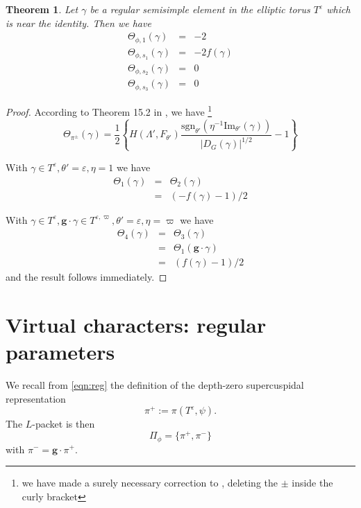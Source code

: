 \documentclass[11pt]{amsart}
\numberwithin{equation}{section}
\newtheorem{thm}[equation]{Theorem}
\def\g{\mathbf{g}}
\def\sgn{\mathrm{sgn}}
\def\fg{\mathfrak{g}}
\def\g{\mathbf{g}}
\newcommand{\<}{\left\langle}
\renewcommand{\>}{\right\rangle}
\begin{document}
    
 \begin{thm}\label{NEAR-NON-REG}  Let $\gamma$ be a regular semisimple element 
in the elliptic torus $T^\varepsilon$ which is near the identity.  Then we  have 
 \begin{eqnarray*}
 \Theta_{\phi, 1}(\gamma) &=& - 2\\
 \Theta_{\phi, s_1}(\gamma) &=& -2f(\gamma)\\
 \Theta_{\phi, s_2}(\gamma) &=& 0\\
 \Theta_{\phi, s_3}(\gamma) & = & 0
 \end{eqnarray*}
 \end{thm}
 \begin{proof}  According to Theorem 15.2 in \cite{ADSS}, we have \footnote{we have made a surely necessary correction to \cite[Theorem 15.2]{ADSS}, deleting the $\pm$ inside the curly bracket} 
 \[
 \Theta_{\pi^\pm}(\gamma) = \frac{1}{2} \left\{H(\Lambda', F_{\theta'}) \frac{\sgn_{\theta'}(\eta^{-1} \mathrm{Im}_{\theta'}(\gamma))}{|D_G(\gamma)|^{1/2}} - 1\right\}
 \]  
 
With $\gamma \in T^\varepsilon, \theta' = \varepsilon, \eta = 1$ we have
 \begin{eqnarray*}
 \Theta_1(\gamma) & = & \Theta_2(\gamma) \\
 & = & ( - f(\gamma) - 1)/2
 \end{eqnarray*}
 
 With $\gamma \in T^\varepsilon, \g \cdot \gamma \in T^{\varepsilon, \varpi}, \theta' = \varepsilon, \eta = \varpi$ we have
 \begin{eqnarray*}
 \Theta_4(\gamma) & = & \Theta_3(\gamma) \\
 &=&  \Theta_1(\g \cdot \gamma)\\ 
 &=& (f(\gamma) - 1)/2
 \end{eqnarray*}
 and the result follows immediately.
 \end{proof}



 
\section{Virtual characters: regular parameters}  We recall from \eqref{eqn:reg} the definition of  the depth-zero supercuspidal representation
\[
\pi^+:= \pi(T^\varepsilon, \psi).
\]
The $L$-packet is then 
\[
\Pi_\phi = \{\pi^+, \pi^-\}
\]
with $\pi^- = \g \cdot \pi^+$.
\end{document}
